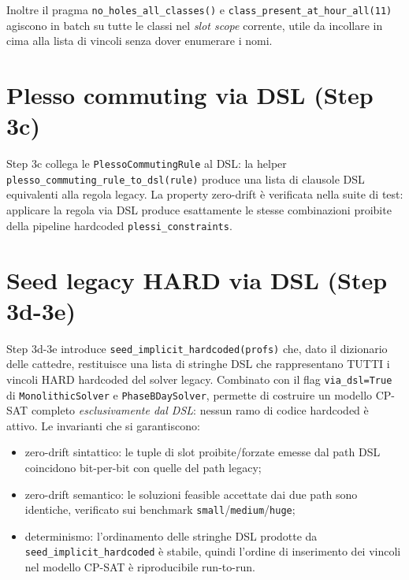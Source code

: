 \medskip

Inoltre il pragma \texttt{no\_holes\_all\_classes()} e
\texttt{class\_present\_at\_hour\_all(11)} agiscono in batch su
tutte le classi nel \emph{slot scope} corrente, utile da
incollare in cima alla lista di vincoli senza dover enumerare i
nomi.

\section{Plesso commuting via DSL (Step 3c)}
\label{sec:dsl-plesso-commuting}

Step 3c collega le \texttt{PlessoCommutingRule} al DSL: la
helper \texttt{plesso\_commuting\_rule\_to\_dsl(rule)} produce
una lista di clausole DSL equivalenti alla regola legacy. La
property zero-drift \`e verificata nella suite di test:
applicare la regola via DSL produce esattamente le stesse
combinazioni proibite della pipeline hardcoded
\texttt{plessi\_constraints}.

\section{Seed legacy HARD via DSL (Step 3d-3e)}
\label{sec:dsl-seed-legacy}

Step 3d-3e introduce \texttt{seed\_implicit\_hardcoded(profs)}
che, dato il dizionario delle cattedre, restituisce una lista
di stringhe DSL che rappresentano TUTTI i vincoli HARD
hardcoded del solver legacy. Combinato con il flag
\texttt{via\_dsl=True} di \texttt{MonolithicSolver} e
\texttt{PhaseBDaySolver}, permette di costruire un modello
CP-SAT completo \emph{esclusivamente dal DSL}: nessun ramo di
codice hardcoded \`e attivo. Le invarianti che si garantiscono:

\begin{itemize}
\item zero-drift sintattico: le tuple di slot proibite/forzate
  emesse dal path DSL coincidono bit-per-bit con quelle del
  path legacy;
\item zero-drift semantico: le soluzioni feasible accettate
  dai due path sono identiche, verificato sui benchmark
  \texttt{small}/\texttt{medium}/\texttt{huge};
\item determinismo: l'ordinamento delle stringhe DSL prodotte
  da \texttt{seed\_implicit\_hardcoded} \`e stabile, quindi
  l'ordine di inserimento dei vincoli nel modello CP-SAT \`e
  riproducibile run-to-run.
\end{itemize}

